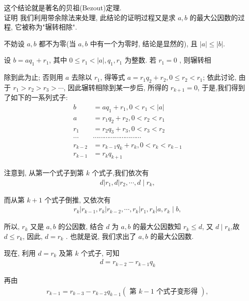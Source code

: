 这个结论就是著名的贝祖(Bezout)定理. \\
证明 我们利用带余除法来处理, 此结论的证明过程又是求 $a ,  b$ 的最大公因数的过程, 它被称为"辗转相除".

不妨设 $a ,  b$ 都不为零(当 $a ,  b$ 中有一个为零时, 结论是显然的), 且 $|a| \leqslant|b|$.

设 $b=a q_{1}+r_{1}$, 其中 $0 \leqslant r_{1}<|a|, q_{1} ,  r_{1}$ 为整数. 若 $r_{1}=0$ , 则辗转相

除到此为止; 否则用 $a$ 去除以 $r_{1}$, 得等式 $a=r_{1} q_{2}+r_{2}, 0 \leqslant r_{2}<r_{1}$; 依此讨论, 由于 $r_{1}>r_{2}>r_{3}>\cdots$, 因此辗转相除到某一步后, 所得的 $r_{k+1}=0$, 于是,我们得到了如下的一系列式子:\begin{align}
	b       & =a q_{1}+r_{1}, 0<r_{1}<|a|                                    \\
	a       & =r_{1} q_{2}+r_{2}, 0<r_{2}<r_{1}                              \\
	r_{1}   & =r_{2} q_{3}+r_{3}, 0<r_{3}<r_{2}                              \\
	\cdots  & \cdots \cdots \cdots \cdots \cdots \cdots \cdots \cdots \cdots \\
	r_{k-2} & =r_{k-1} q_{k}+r_{k}, 0<r_{k}<r_{k-1}                          \\
	r_{k-1} & =r_{k} q_{k+1}
\end{align}

注意到, 从第一个式子到第 $k$ 个式子,我们依次有
\begin{align*}
	d\left|r_{1}, d\right| r_{2}, \cdots, d \mid r_{k},
\end{align*}

而从第 $k+1$ 个式子倒推, 又依次有
\begin{align*}
	r_{k}\left|r_{k-1}, r_{k}\right| r_{k-2}, \cdots, r_{k}\left|r_{1}, r_{k}\right| a, r_{k} \mid b,
\end{align*}

所以, $r_{k}$ 又是 $a ,  b$ 的公因数, 结合 $d$ 为 $a ,  b$ 的最大公因数知 $r_{k} \leqslant d$, 又 $d \mid r_{k}$,故 $d \leqslant r_{k}$, 因此, $d=r_{k}$ . 也就是说, 我们求出了 $a ,  b$ 的最大公因数.

现在, 利用 $d=r_{k}$ 及第 $k$ 个式子, 可知
\begin{align*}
	d=r_{k-2}-r_{k-1} q_{k}
\end{align*}

再由
\begin{align*}
	r_{k-1}=r_{k-3}-r_{k-2} q_{k-1}(\text { 第 } k-1 \text { 个式子变形得 }),
\end{align*}

